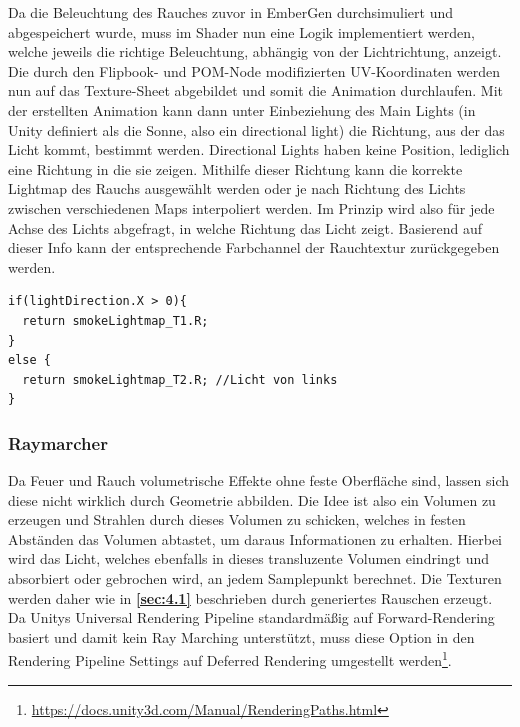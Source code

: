 Da die Beleuchtung des Rauches zuvor in EmberGen durchsimuliert und abgespeichert wurde, muss im Shader nun eine Logik implementiert werden, welche jeweils die richtige Beleuchtung,
abhängig von der Lichtrichtung, anzeigt. Die durch den Flipbook- und POM-Node modifizierten UV-Koordinaten werden nun auf das Texture-Sheet abgebildet und somit die Animation durchlaufen.
Mit der erstellten Animation kann dann unter Einbeziehung des Main Lights (in Unity definiert als die Sonne, also ein directional light) die Richtung, aus der
das Licht kommt, bestimmt werden. Directional Lights haben keine Position, lediglich eine Richtung in die sie zeigen. Mithilfe dieser Richtung kann die korrekte Lightmap
des Rauchs ausgewählt werden oder je nach Richtung des Lichts zwischen verschiedenen Maps interpoliert werden. Im Prinzip wird also für jede Achse des Lichts abgefragt,
in welche Richtung das Licht zeigt. Basierend auf dieser Info kann der entsprechende Farbchannel der Rauchtextur zurückgegeben werden.


\vspace{.6cm}
\begin{lstlisting}[language={[Sharp]C}, label={lst:lightMapLogik}, caption={Logik zur Auswahl der richtigen Lightmap am Beispiel der X-Richtung des Lichts.},captionpos=b, frame=single]
if(lightDirection.X > 0){
  return smokeLightmap_T1.R; 
}
else {
  return smokeLightmap_T2.R; //Licht von links
}

\end{lstlisting}


\subsubsection{Raymarcher}

Da Feuer und Rauch volumetrische Effekte ohne feste Oberfläche sind, lassen sich diese nicht wirklich durch Geometrie abbilden. Die Idee ist also ein
Volumen zu erzeugen und Strahlen durch dieses Volumen zu schicken, welches in festen Abständen das Volumen abtastet, um daraus Informationen zu erhalten.
Hierbei wird das Licht, welches ebenfalls in dieses transluzente Volumen eindringt und absorbiert oder gebrochen wird, an jedem Samplepunkt berechnet.
Die Texturen werden daher wie in \textbf{\autoref{sec:4.1}} beschrieben durch generiertes Rauschen erzeugt.
Da Unitys Universal Rendering Pipeline standardmäßig auf Forward-Rendering basiert und damit kein Ray Marching unterstützt, muss diese Option in den Rendering Pipeline Settings
auf Deferred Rendering umgestellt werden\footnote{\url{https://docs.unity3d.com/Manual/RenderingPaths.html}}.




